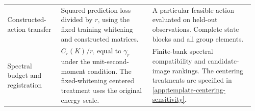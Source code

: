 \begin{table}[t]
\begin{tabular}{
 @{}p{}
 p{}
 p{}@{}
}
{\raggedright
Constructed-action transfer\par}
&
Squared prediction loss divided by $r$,
using the fixed training whitening and constructed matrices.
&
A particular feasible action evaluated on held-out
observations.
Complete state blocks and all group elements.
\\[3pt]

{\raggedright
Spectral budget and registration\par}
&
$C_r(K)/r$, equal to $\gamma_r$ under the
unit-second-moment condition.
The fixed-whitening centered treatment uses the original
energy scale.
&
Finite-bank spectral compatibility and candidate-image
rankings.
The centering treatments are specified in
\cref{app:template-centering-sensitivity}.
\\

\bottomrule
\end{tabular}
\end{table}

\FloatBarrier
